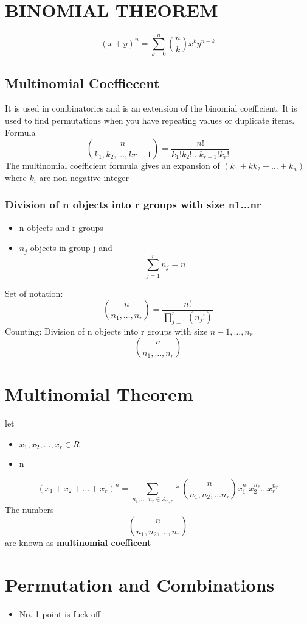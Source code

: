 \documentclass{article}
\begin{document}
\section{BINOMIAL THEOREM}
\begin{equation}
    (x+y)^{n} = \sum_{k=0}^{n}\binom{n}{k}x^{k}y^{n-k}
\end{equation}  
\subsection*{Multinomial Coeffiecent}
It is used in combinatorics and is an extension of the binomial coefficient. It is used to find permutations when you have repeating values or duplicate items. \\
Formula 
\begin{equation}
    \binom{n}{k_{1},k_{2},...,k{r-1}}= \frac{n!}{k_{1}!k_{2}!\ldots k_{r-1}!k_{r}!}
\end{equation}
The multinomial coefficient formula gives an expansion of $(k_{1}+kk_{2}+\ldots + k_{n})$ where $k_{i}$ are non negative integer
\subsubsection{Division of n objects into r groups with size n1...nr}
\begin{itemize}
    \item n objects and r groups 
    \item $n_{j}$ objects in group j and \[\sum_{j=1}^{r}n_{j}=n\]
\end{itemize}
Set of notation:
\[\binom{n}{n_{1},\ldots,n_{r}}= \frac{n!}{\prod_{j=1}^{r}(n_{j}!)}\]
Counting: Division of n objects into r groups with size $n-{1}, \ldots, n_{r}$ = \[\binom{n}{n_{1},\ldots,n_{r}}\]
\section{Multinomial Theorem}
let 
\begin{itemize}
    \item $x_{1},x_{2},\ldots,x_{r} \in R $
    \item n 
\end{itemize}
\begin{equation}
    (x_{1}+x_{2}+\ldots + x_{r})^n = \sum_{n_{1},\ldots,n_{r}\in
    A_{n,r}}*\binom{n}{n_{1},n_{2},\ldots n_{r}}x_{1}^{n_1}x_{2}^{n_2}\ldots x_{r}^{n_r}  
\end{equation}
The numbers \[ \binom{n}{n_1, n_2,\ldots, n_r}\] are known as \textbf{multinomial coefficent}
\section*{Permutation and Combinations}
\begin{itemize}
    \item No. 1 point is fuck off
\end{itemize}
\end{document}
